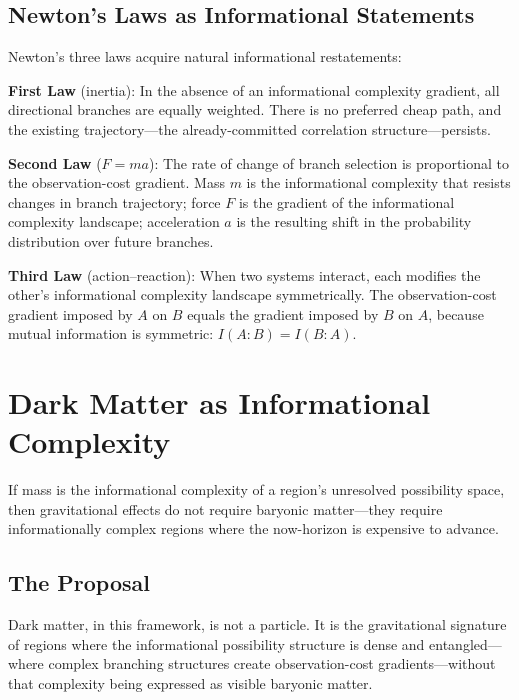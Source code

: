 \documentclass[12pt,a4paper]{article}
\begin{document}
\subsection{Newton's Laws as Informational Statements}

Newton's three laws acquire natural informational restatements:

\textbf{First Law} (inertia): In the absence of an informational complexity gradient, all directional branches are equally weighted. There is no preferred cheap path, and the existing trajectory---the already-committed correlation structure---persists.

\textbf{Second Law} ($F = ma$): The rate of change of branch selection is proportional to the observation-cost gradient. Mass $m$ is the informational complexity that resists changes in branch trajectory; force $F$ is the gradient of the informational complexity landscape; acceleration $a$ is the resulting shift in the probability distribution over future branches.

\textbf{Third Law} (action--reaction): When two systems interact, each modifies the other's informational complexity landscape symmetrically. The observation-cost gradient imposed by $A$ on $B$ equals the gradient imposed by $B$ on $A$, because mutual information is symmetric: $I(A:B) = I(B:A)$.

\section{Dark Matter as Informational Complexity}
\label{sec:darkmatter}

If mass is the informational complexity of a region's unresolved possibility space, then gravitational effects do not require baryonic matter---they require informationally complex regions where the now-horizon is expensive to advance.

\subsection{The Proposal}

Dark matter, in this framework, is not a particle. It is the gravitational signature of regions where the informational possibility structure is dense and entangled---where complex branching structures create observation-cost gradients---without that complexity being expressed as visible baryonic matter.
\end{document}
